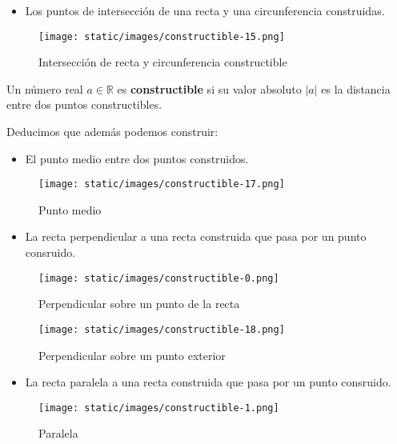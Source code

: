 \begin{itemize}
\tightlist
\item
  Los puntos de intersección de una recta y una circunferencia
  construidas.
\end{itemize}

\begin{figure}
\centering
\texttt{[image: static/images/constructible-15.png]}
\caption{Intersección de recta y circunferencia constructible}
\end{figure}

Un número real \(a\in\mathbb R\) es \textbf{constructible} si su valor
absoluto \(|a|\) es la distancia entre dos puntos constructibles.


Deducimos que además podemos construir:

\begin{itemize}
\tightlist
\item
  El punto medio entre dos puntos construidos.
\end{itemize}

\begin{figure}
\centering
\texttt{[image: static/images/constructible-17.png]}
\caption{Punto medio}
\end{figure}

\begin{itemize}
\tightlist
\item
  La recta perpendicular a una recta construida que pasa por un punto
  consruido.
\end{itemize}

\begin{figure}
\centering
\texttt{[image: static/images/constructible-0.png]}
\caption{Perpendicular sobre un punto de la recta}
\end{figure}

\begin{figure}
\centering
\texttt{[image: static/images/constructible-18.png]}
\caption{Perpendicular sobre un punto exterior}
\end{figure}

\begin{itemize}
\tightlist
\item
  La recta paralela a una recta construida que pasa por un punto
  consruido.
\end{itemize}

\begin{figure}
\centering
\texttt{[image: static/images/constructible-1.png]}
\caption{Paralela}
\end{figure}

